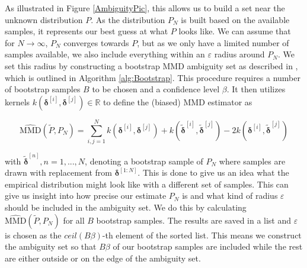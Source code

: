 As illustrated in Figure \ref{AmbiguityPic}, this allows us to build a set near the unknown distribution $P$. As the distribution $P_N$ is built based on the available samples, it represents our best guess at what $P$ looks like. We can assume that for $N \to \infty$, $P_N$ converges towards $P$, but as we only have a limited number of samples available, we also include everything within an $\varepsilon$ radius around $P_N$. We set this radius by constructing a bootstrap MMD ambiguity set as described in \cite{Yassine_22}, which is outlined in Algorithm \ref{alg:Bootstrap}. This procedure requires a number of bootstrap samples $B$ to be chosen and a confidence level $\beta$. It then utilizes kernels $k(\boldsymbol{\delta}^{[i]}, \boldsymbol{\delta}^{[j]}) \in \mathbb{R}$ to define the (biased) MMD estimator as 

\begin{equation} \label{ambiguity set approx}
\widehat{\text{MMD}} (\tilde{P}, P_N) = \sum_{i,j = 1}^N k(\boldsymbol{\delta}^{[i]}, \boldsymbol{\delta}^{[j]}) + k(\tilde{\boldsymbol{\delta}}^{[i]}, \tilde{\boldsymbol{\delta}}^{[j]}) - 2 k(\boldsymbol{\delta}^{[i]}, \tilde{\boldsymbol{\delta}}^{[j]})
\end{equation}

with $\tilde{\boldsymbol{\delta}}^{[n]}, n = 1,...,N$, denoting a bootstrap sample of $P_N$ where samples are drawn with replacement from $\boldsymbol{\delta}^{[1:N]}$. This is done to give us an idea what the empirical distribution might look like with a different set of samples. This can give us insight into how precise our estimate $P_N$ is and what kind of radius $\varepsilon$ should be included in the ambiguity set. We do this by calculating $\widehat{\text{MMD}} (\tilde{P}, P_N)$ for all $B$ bootstrap samples. The results are saved in a list and $\varepsilon$ is chosen as the $\textit{ceil}(B \beta)$-th element of the sorted list. This means we construct the ambiguity set so that $B \beta$ of our bootstrap samples are included while the rest are either outside or on the edge of the ambiguity set.


